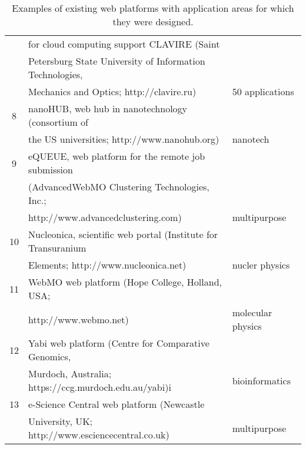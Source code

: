 \documentclass[procedia]{easychair}
\begin{document}
\begin{table}[htp]
\begin{centering}
\begin{tabular}{|c|l|l|}
	      & for cloud computing support CLAVIRE \cite{17} (Saint & \\
	      & Petersburg State University of Information Technologies, & \\
	      & Mechanics and Optics; http://clavire.ru) &  50 applications \\
	    \hline
	    8 & nanoHUB, web hub in nanotechnology \cite{18} (consortium of &\\
	      & the US universities; http://www.nanohub.org) & nanotech \\
	    \hline
	    9 & eQUEUE, web platform for the remote job submission & \\
	      & (AdvancedWebMO Clustering Technologies, Inc.; & \\
	      & http://www.advancedclustering.com) & multipurpose\\
	    \hline
	   10 & Nucleonica, scientific web portal (Institute for Transuranium & \\
	      & Elements; http://www.nucleonica.net) & nucler physics\\
	    \hline
	   11 & WebMO web platform (Hope College, Holland, USA;& \\
	      &  http://www.webmo.net) & molecular physics\\
	    \hline
	   12 & Yabi web platform \cite{19} (Centre for Comparative Genomics,& \\
	      & Murdoch, Australia; https://ccg.murdoch.edu.au/yabi)i & bioinformatics \\
	    \hline
	   13 & e-Science Central web platform \cite{20} (Newcastle & \\
	      & University, UK; http://www.esciencecentral.co.uk) & multipurpose\\
		\hline
		\end{tabular}
		\caption{Examples of existing web platforms with application areas for which they were designed.}
		\label{tab:examples}
	\end{centering}
\end{table}
\end{document}
